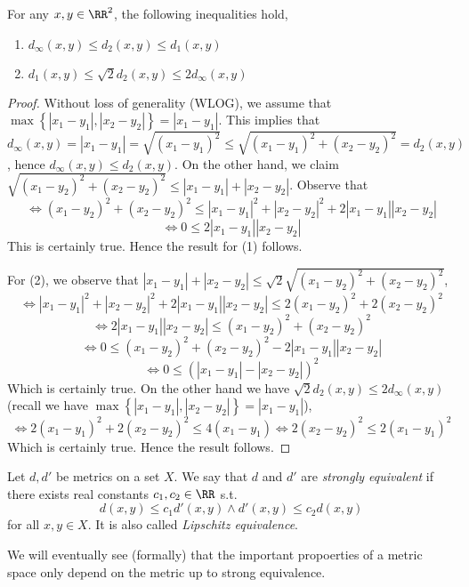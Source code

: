 \begin{lemma}
  For any $x,y\in\RR^2$, the following inequalities hold,
  \begin{enumerate}
    \item $d_{\infty}(x,y) \leq d_{2}(x,y) \leq d_1(x,y)$
    \item $d_1(x,y) \leq \sqrt{2}d_2(x,y) \leq 2 d_{\infty}(x,y)$
  \end{enumerate}
\end{lemma}
\begin{proof}
  Without loss of generality (WLOG), we assume that $\max\left\{
  |x_1-y_1|,|x_2-y_2| \right\} = |x_1-y_1|$. This implies that $d_{\infty}(x,y)
  = |x_1-y_1| = \sqrt{(x_1-y_1)^2} \leq \sqrt{(x_1-y_1)^2 + (x_2-y_2)^2} =
  d_2(x,y)$, hence $d_{\infty}(x,y)\leq d_{2}(x,y)$. On the other hand, we claim
  $\sqrt{(x_1-y_2)^2 + (x_2-y_2)^2} \leq |x_1-y_1| + |x_2-y_2|$. Observe that 
  \[\iff (x_1-y_2)^2 + (x_2-y_2)^2 \leq |x_1-y_1|^2 + |x_2-y_2|^2 + 2|x_1-y_1||x_2-y_2|\]
  \[\iff 0\leq 2|x_1-y_1||x_2-y_2|\]
  This is certainly true. Hence the result for (1) follows.

  For (2), we observe that $|x_1-y_1| + |x_2-y_2| \leq \sqrt{2}\sqrt{(x_1-y_2)^2 +
  (x_2-y_2)^2}$,
  \[\iff |x_1-y_1|^2 + |x_2-y_2|^2 + 2|x_1-y_1||x_2-y_2| \leq 2(x_1-y_2)^2 + 2(x_2-y_2)^2\]
  \[\iff 2|x_1-y_1||x_2-y_2| \leq (x_1-y_2)^2 + (x_2-y_2)^2\]
  \[\iff 0\leq(x_1-y_2)^2 + (x_2-y_2)^2 - 2|x_1-y_1||x_2-y_2| \]
  \[\iff 0 \leq (|x_1-y_1| - |x_2-y_2|)^2\]
  Which is certainly true. On the other hand we have $\sqrt{2}d_2(x,y)\leq
 2d_{\infty}(x,y)$ (recall we have $\max\left\{
 |x_1-y_1|,|x_2-y_2| \right\} = |x_1-y_1|$),
 \[\iff 2(x_1-y_1)^2 + 2(x_2-y_2)^2 \leq 4(x_1-y_1) \iff 2(x_2-y_2)^2 \leq
 2(x_1-y_1)^2 \]
 Which is certainly true. Hence the result follows.
\end{proof}

\begin{definition}
  Let $d,d'$ be metrics on a set $X$. We say that $d$ and $d'$ are
  \emph{strongly equivalent} if there exists real constants $c_1,c_2\in\RR$ s.t.
  \[d(x,y)\leq c_1 d'(x,y) \land d'(x,y) \leq c_2 d(x,y)\]
  for all $x,y\in X$. It is also called \emph{Lipschitz equivalence}.
\end{definition}
We will eventually see (formally) that the important propoerties of a metric
space only depend on the metric up to strong equivalence.

